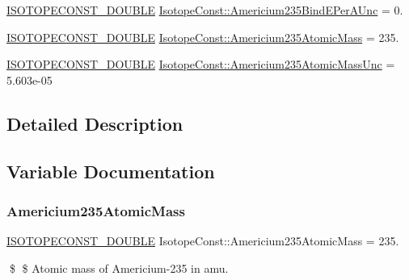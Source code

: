 \begin{DoxyCompactItemize}
\mbox{\hyperlink{group___isotope_const-_macros_ga8f45a7272ce02c0b4c65c44636ed719a}{I\+S\+O\+T\+O\+P\+E\+C\+O\+N\+S\+T\+\_\+\+D\+O\+U\+B\+LE}} \mbox{\hyperlink{group___isotope_const-_americium-_am235_gaa2ef723dadcf880a6323a740ae9abc7f}{Isotope\+Const\+::\+Americium235\+Bind\+E\+Per\+A\+Unc}} = 0.
\item 
\mbox{\hyperlink{group___isotope_const-_macros_ga8f45a7272ce02c0b4c65c44636ed719a}{I\+S\+O\+T\+O\+P\+E\+C\+O\+N\+S\+T\+\_\+\+D\+O\+U\+B\+LE}} \mbox{\hyperlink{group___isotope_const-_americium-_am235_ga66990310e81f2e89757be4e84cfc725b}{Isotope\+Const\+::\+Americium235\+Atomic\+Mass}} = 235.
\item 
\mbox{\hyperlink{group___isotope_const-_macros_ga8f45a7272ce02c0b4c65c44636ed719a}{I\+S\+O\+T\+O\+P\+E\+C\+O\+N\+S\+T\+\_\+\+D\+O\+U\+B\+LE}} \mbox{\hyperlink{group___isotope_const-_americium-_am235_ga47a0c2ae9376f74527dd15e4d9d9f168}{Isotope\+Const\+::\+Americium235\+Atomic\+Mass\+Unc}} = 5.\+603e-\/05
\end{DoxyCompactItemize}


\subsection{Detailed Description}


\subsection{Variable Documentation}
\mbox{\label{group___isotope_const-_americium-_am235_ga66990310e81f2e89757be4e84cfc725b}} 
\subsubsection{\texorpdfstring{Americium235\+Atomic\+Mass}{Americium235AtomicMass}}
{\footnotesize\ttfamily \mbox{\hyperlink{group___isotope_const-_macros_ga8f45a7272ce02c0b4c65c44636ed719a}{I\+S\+O\+T\+O\+P\+E\+C\+O\+N\+S\+T\+\_\+\+D\+O\+U\+B\+LE}} Isotope\+Const\+::\+Americium235\+Atomic\+Mass = 235.}

\$ \$ Atomic mass of Americium-\/235 in amu. \mbox{\label{group___isotope_const-_americium-_am235_ga47a0c2ae9376f74527dd15e4d9d9f168}} 
